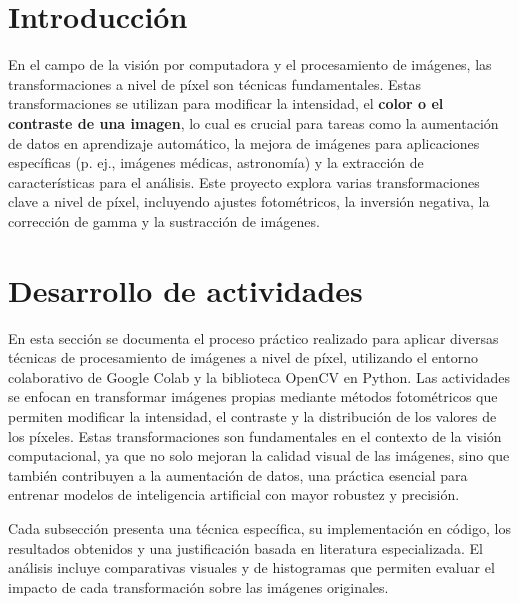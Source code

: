 \documentclass[12pt,letterpaper]{article}
\begin{document}
\newpage

\tableofcontents
\newpage

\listoffigures
\newpage

\section{Introducción}

En el campo de la visión por computadora y el procesamiento de imágenes, las transformaciones a nivel de píxel son técnicas fundamentales. Estas transformaciones se utilizan para modificar la intensidad, el \textbf{color o el contraste de una imagen}, lo cual es crucial para tareas como la aumentación de datos en aprendizaje automático, la mejora de imágenes para aplicaciones específicas (p. ej., imágenes médicas, astronomía) y la extracción de características para el análisis. Este proyecto explora varias transformaciones clave a nivel de píxel, incluyendo ajustes fotométricos, la inversión negativa, la corrección de gamma y la sustracción de imágenes.


\newpage

\section{Desarrollo de actividades}

En esta sección se documenta el proceso práctico realizado para aplicar diversas técnicas de procesamiento de imágenes a nivel de píxel, utilizando el entorno colaborativo de Google Colab y la biblioteca OpenCV en Python. Las actividades se enfocan en transformar imágenes propias mediante métodos fotométricos que permiten modificar la intensidad, el contraste y la distribución de los valores de los píxeles. Estas transformaciones son fundamentales en el contexto de la visión computacional, ya que no solo mejoran la calidad visual de las imágenes, sino que también contribuyen a la aumentación de datos, una práctica esencial para entrenar modelos de inteligencia artificial con mayor robustez y precisión.

Cada subsección presenta una técnica específica, su implementación en código, los resultados obtenidos y una justificación basada en literatura especializada. El análisis incluye comparativas visuales y de histogramas que permiten evaluar el impacto de cada transformación sobre las imágenes originales.
\end{document}
